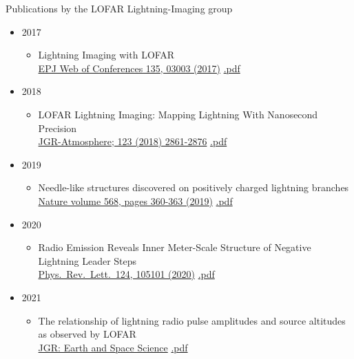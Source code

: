 \documentclass[fleqn,11pt]{article}
\begin{document}
{\Large Publications by the LOFAR Lightning-Imaging group}

\begin{itemize}
\item{2017}
\begin{itemize}
\item Lightning Imaging with LOFAR
\\ \href{https://doi.org/10.1051/epjconf/201713503003}{EPJ Web of Conferences 135, 03003 (2017)}
\href{https://www.epj-conferences.org/articles/epjconf/pdf/2017/04/epjconf_arena2017_03003.pdf}{.pdf}
\end{itemize}

\item{2018}
\begin{itemize}
\item LOFAR Lightning Imaging: Mapping Lightning With Nanosecond Precision
\\ \href{https://doi.org/10.1002/2017JD028132}{JGR-Atmosphere; 123 (2018) 2861-2876}
\href{https://drive.google.com/file/d/1vezngJcZ61hRrt8Tcy9CnP_zXdV4bjua/view?usp=sharing}{.pdf}
\end{itemize}

\item{2019}
\begin{itemize}
\item Needle-like structures discovered on positively charged lightning branches
\\ \href{https://doi.org/10.1038/s41586-019-1086-6}{Nature volume 568, pages 360-363 (2019)}
\href{https://drive.google.com/file/d/13ZQhrlQCmd03sfZ765F3xytzUnJzobnH/view?usp=sharing}{.pdf}
\end{itemize}

\item{2020}
\begin{itemize}
\item Radio Emission Reveals Inner Meter-Scale Structure of Negative Lightning Leader Steps
\\ \href{https://doi.org/10.1103/PhysRevLett.124.105101}{Phys.\ Rev.\ Lett.\ 124, 105101 (2020)}
\href{https://drive.google.com/file/d/1KHlmFhRyaO-jcH-ZWVmEFVZMldi75vc7/view?usp=sharing}{.pdf}
\end{itemize}


\item{2021}
\begin{itemize}
\item The relationship of lightning radio pulse amplitudes and source altitudes as observed by LOFAR
\\ \href{https://doi.org/10.1029/2021EA001958}{JGR: Earth and Space Science}
\href{https://drive.google.com/file/d/19CIRVmTa6FGWF4RwcSvupHWzvTjZF5Lv/view?usp=sharing}{.pdf}


\end{itemize}
\end{itemize}
\end{document}
